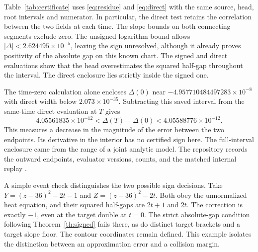 Table~\ref{tab:certificate} uses \eqref{eq:residue} and \eqref{eq:direct} with the same source, head, root intervals and numerator. In particular, the direct test retains the correlation between the two fields at each time. The slope bounds on both connecting segments exclude zero. The unsigned logarithm bound allows \(|\Delta|<2.624495\times10^{-5}\), leaving the sign unresolved, although it already proves positivity of the absolute gap on this known chart. The signed and direct evaluations show that the head overestimates the squared half-gap throughout the interval. The direct enclosure lies strictly inside the signed one.

The time-zero calculation alone encloses \(\Delta(0)\) near \(-4.957710484497283\times10^{-8}\) with direct width below \(2.073\times10^{-35}\). Subtracting this saved interval from the same-time direct evaluation at \(T\) gives
\[
 4.05561835\times10^{-12}<\Delta(T)-\Delta(0)<4.05588776\times10^{-12}.
\]
This measures a decrease in the magnitude of the error between the two endpoints. Its derivative in the interior has no certified sign here. The full-interval enclosure came from the range of a joint analytic model. The repository records the outward endpoints, evaluator versions, counts, and the matched internal replay \cite{jh07,jh08}.

A simple event check distinguishes the two possible sign decisions. Take
\(Y=(z-36)^2-2t-1\) and \(Z=(z-36)^2-2t\). Both obey the unnormalized heat equation, and their squared half-gaps are \(2t+1\) and \(2t\). The correction is exactly \(-1\), even at the target double at \(t=0\). The strict absolute-gap condition following Theorem~\ref{th:signed} fails there, as do distinct target brackets and a target slope floor. The contour coordinates remain defined. This example isolates the distinction between an approximation error and a collision margin.
